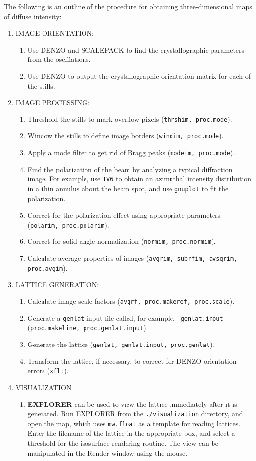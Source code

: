 
The following is an outline of the procedure for obtaining
three-dimensional maps of diffuse intensity:

\begin{enumerate}

\item IMAGE ORIENTATION:
\begin{enumerate}
\item Use DENZO and SCALEPACK to find the crystallographic parameters
from the oscillations.
\item Use DENZO to output the crystallographic orientation matrix for
each of the stills.
\end{enumerate}
\item IMAGE PROCESSING:
\begin{enumerate}
\item Threshold the stills to mark overflow pixels ({\tt thrshim,
proc.mode}). 
\item Window the stills to define image borders ({\tt windim,
proc.mode}). 
\item Apply a mode filter to get rid of Bragg peaks ({\tt modeim,
proc.mode}). 
\item Find the polarization of the beam by analyzing a typical 
diffraction image.  For example, use {\tt TV6} to obtain an azimuthal
intensity distribution in a thin annulus about the beam spot, and use
{\tt gnuplot} to fit the polarization.
\item Correct for the polarization effect using appropriate parameters
({\tt polarim, proc.polarim}). 
\item Correct for solid-angle normalization ({\tt normim,
proc.normim}).
\item Calculate average properties of images ({\tt avgrim, subrfim,
avsqrim, proc.avgim}).
\end{enumerate}
\item LATTICE GENERATION:
\begin{enumerate}
\item Calculate image scale factors ({\tt avgrf, proc.makeref,
proc.scale}). 
\item Generate a {\tt genlat} input file called, for example, {\tt
genlat.input} ({\tt proc.makeline, 
proc.genlat.input}). 
\item Generate the lattice ({\tt genlat, genlat.input, proc.genlat}).
\item Transform the lattice, if necessary, to correct for DENZO
orientation errors ({\tt xflt}).
\end{enumerate}
\item VISUALIZATION
\begin{enumerate}
\item {\bf EXPLORER} can be used to view the lattice immediately after
it is generated.  Run EXPLORER from the {\tt ./visualization}
directory, and open the  map, which uses
{\tt mw.float} as a template for reading lattices.  Enter the filename
of the lattice in the appropriate box, and select a threshold for the
isosurface rendering routine.  The view can be manipulated in the
Render window using the mouse.


\end{enumerate}
\end{enumerate}
